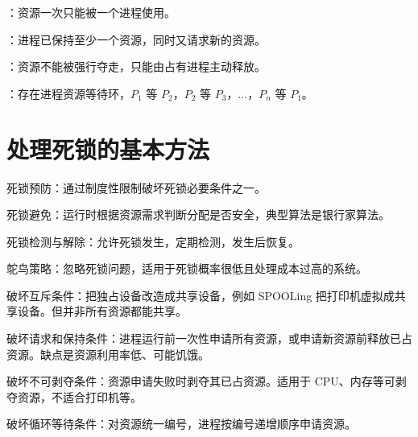 \begin{points}
  \item {}：资源一次只能被一个进程使用。
  \item {}：进程已保持至少一个资源，同时又请求新的资源。
  \item {}：资源不能被强行夺走，只能由占有进程主动释放。
  \item {}：存在进程资源等待环，$P_1$ 等 $P_2$，$P_2$ 等 $P_3$，$\ldots$，$P_n$ 等 $P_1$。
\end{points}

\section{处理死锁的基本方法}
\begin{points}
  \item 死锁预防：通过制度性限制破坏死锁必要条件之一。
  \item 死锁避免：运行时根据资源需求判断分配是否安全，典型算法是银行家算法。
  \item 死锁检测与解除：允许死锁发生，定期检测，发生后恢复。
  \item 鸵鸟策略：忽略死锁问题，适用于死锁概率很低且处理成本过高的系统。
\end{points}


\begin{points}
  \item 破坏互斥条件：把独占设备改造成共享设备，例如 SPOOLing 把打印机虚拟成共享设备。但并非所有资源都能共享。
  \item 破坏请求和保持条件：进程运行前一次性申请所有资源，或申请新资源前释放已占资源。缺点是资源利用率低、可能饥饿。
  \item 破坏不可剥夺条件：资源申请失败时剥夺其已占资源。适用于 CPU、内存等可剥夺资源，不适合打印机等。
  \item 破坏循环等待条件：对资源统一编号，进程按编号递增顺序申请资源。
\end{points}


